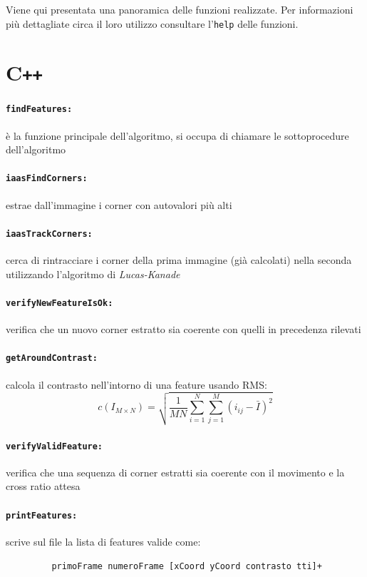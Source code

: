 \documentclass[12pt]{report}
\begin{document}
Viene qui presentata una panoramica delle funzioni realizzate. Per informazioni pi\`u dettagliate circa il loro utilizzo consultare l'\verb|help| delle funzioni.

\section[C++]{C\verb_++_}

\paragraph*{\verb_findFeatures:_} \`e la funzione principale dell'algoritmo, si occupa di chiamare le sottoprocedure dell'algoritmo

\paragraph*{\verb_iaasFindCorners:_} estrae dall'immagine i corner con autovalori pi\`u alti

\paragraph*{\verb_iaasTrackCorners:_} cerca di rintracciare i corner della prima immagine (gi\`a calcolati) nella seconda utilizzando l'algoritmo di \emph{Lucas-Kanade}

\paragraph*{\verb_verifyNewFeatureIsOk:_} verifica che un nuovo corner estratto sia coerente con quelli in precedenza rilevati

\paragraph*{\verb_getAroundContrast:_} calcola il contrasto nell'intorno di una feature usando RMS: $$ c\left(I_{M\times N}\right) = \sqrt{\frac{1}{MN}\sum_{i=1}^N\sum_{j=1}^M(i_{ij}-\bar{I})^2} $$

\paragraph*{\verb_verifyValidFeature:_} verifica che una sequenza di corner estratti sia coerente con il movimento e la cross ratio attesa

\paragraph*{\verb_printFeatures:_} scrive sul file la lista di features valide come:
\begin{verbatim}
	     primoFrame numeroFrame [xCoord yCoord contrasto tti]+
\end{verbatim}
\end{document}
